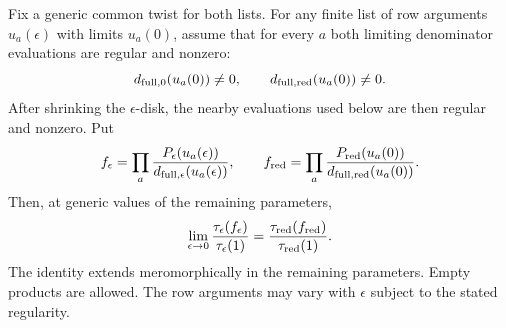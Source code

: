 \begin{lemma}\label{lem:scalar-two-site-fusion}
Fix a generic common twist for both lists. For any finite list of row arguments $u_a(\epsilon)$ with limits $u_a(0)$, assume that for every $a$ both limiting denominator evaluations are regular and nonzero:
\[
 d_{{\rm full},0}(u_a(0))\ne0,
 \qquad d_{{\rm full},{\rm red}}(u_a(0))\ne0.
\]
After shrinking the $\epsilon$-disk, the nearby evaluations used below are then regular and nonzero. Put
\[
 f_\epsilon=\prod_a\frac{P_\epsilon(u_a(\epsilon))}
                         {d_{{\rm full},\epsilon}(u_a(\epsilon))},
 \qquad
 f_{\rm red}=\prod_a\frac{P_{\rm red}(u_a(0))}
                         {d_{{\rm full},{\rm red}}(u_a(0))}.
\]
Then, at generic values of the remaining parameters,
\begin{equation}\label{eq:scalar-two-site-fusion}
 \lim_{\epsilon\to0}\frac{\tau_\epsilon(f_\epsilon)}{\tau_\epsilon(1)}
 =\frac{\tau_{\rm red}(f_{\rm red})}{\tau_{\rm red}(1)}.
\end{equation}
The identity extends meromorphically in the remaining parameters. Empty products are allowed. The row arguments may vary with $\epsilon$ subject to the stated regularity.
\end{lemma}

